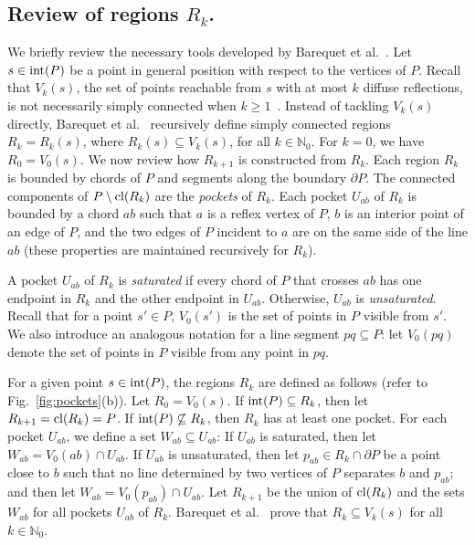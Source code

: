 \documentclass[12pt]{article}
\begin{document}
\subsection{Review of regions $R_k$.}

We briefly review the necessary tools developed by Barequet et al.~\cite{Us}. Let $s \in {\rm int}(P)$ be a point in general position with respect to the vertices of $P$. Recall that $V_k(s)$, the set of points reachable from $s$ with at most $k$ diffuse reflections, is not necessarily simply connected when $k\geq 1$~\cite{BPS04}. Instead of tackling $V_k(s)$ directly, Barequet et al.~\cite{Us} recursively define simply connected regions $R_k=R_k(s)$, where $R_k(s)\subseteq V_k(s)$, for all $k\in \mathbb{N}_0$. For $k=0$, we have $R_0=V_0(s)$. We now review how $R_{k+1}$ is constructed from $R_k$. Each region $R_k$ is bounded by chords of $P$ and segments along the boundary $\partial P$. The connected components of $P\setminus {\rm cl}(R_k)$ are the \emph{pockets} of $R_k$. Each pocket $U_{ab}$ of $R_k$ is bounded by a chord $ab$ such that $a$ is a reflex vertex of $P$, $b$ is an interior point of an edge of $P$, and the two edges of $P$ incident to $a$ are on the same side of the line $ab$ (these properties are maintained recursively for $R_k$).

A pocket $U_{ab}$ of $R_k$ is \emph{saturated} if every chord of $P$ that crosses $ab$ has one endpoint in $R_k$ and the other endpoint in $U_{ab}$. Otherwise, $U_{ab}$ is \emph{unsaturated}. Recall that for a point $s'\in P$, $V_0(s')$ is the set of points in $P$ visible from $s'$. We also introduce an analogous notation for a line segment $pq\subseteq P$: let $V_0(pq)$ denote the set of points in $P$ visible from any point in $pq$.

For a given point $s\in {\rm int}(P)$, the regions $R_k$ are defined as follows (refer to Fig.~\ref{fig:pockets}(b)). Let $R_0=V_0(s)$. If ${\rm int}(P)\subseteq R_k$,
then let $R_{k+1}={\rm cl}(R_k)=P$. If ${\rm int}(P)\not\subseteq R_k$, then $R_k$ has at least one pocket.
For each pocket $U_{ab}$, we define a set $W_{ab}\subseteq U_{ab}$:
If $U_{ab}$ is saturated, then let $W_{ab}=V_0(ab)\cap U_{ab}$.
If $U_{ab}$ is unsaturated, then let $p_{ab}\in R_k\cap \partial P$ be a point close to $b$
such that no line determined by two vertices of $P$ separates $b$ and $p_{ab}$;
and then let $W_{ab}=V_0(p_{ab})\cap U_{ab}$. Let $R_{k+1}$ be the union of ${\rm cl}(R_k)$
and the sets $W_{ab}$ for all pockets $U_{ab}$ of $R_k$. Barequet et al.~\cite{Us} prove
that $R_k\subseteq V_k(s)$ for all $k\in \mathbb{N}_0$.
\end{document}

